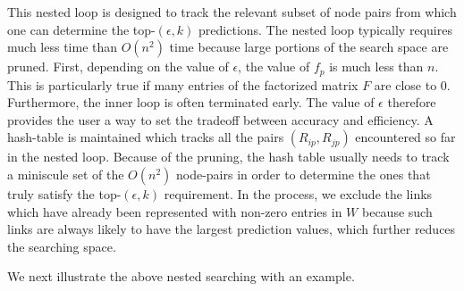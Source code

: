 This nested loop is designed to track the relevant subset of node
pairs from which one can determine the top-$(\epsilon, k)$
predictions.  The nested loop typically requires much less time than
$O(n^2)$ time because large portions of the search space are pruned.
First, depending on the value of $\epsilon$, the value of $f_p$ is
much less than $n$.  This is particularly true if many entries of
the factorized matrix $F$ are close to 0.  Furthermore, the inner
loop is often terminated early. The value of $\epsilon$ therefore
provides the user a way to set the tradeoff between accuracy and
efficiency. A hash-table is maintained which tracks all the pairs
$(R_{ip}, R_{jp})$ encountered so far in the nested loop. Because of
the pruning, the hash table usually needs to track a miniscule set
of the $O(n^2)$ node-pairs in order to determine the ones that truly satisfy the top-$(\epsilon, k)$ requirement. In the process, we exclude
the links which have already been represented with non-zero entries in $W$
because such links are always likely to have the largest prediction values,
which further reduces the searching space.


We next illustrate the above nested searching with an
example.
 
